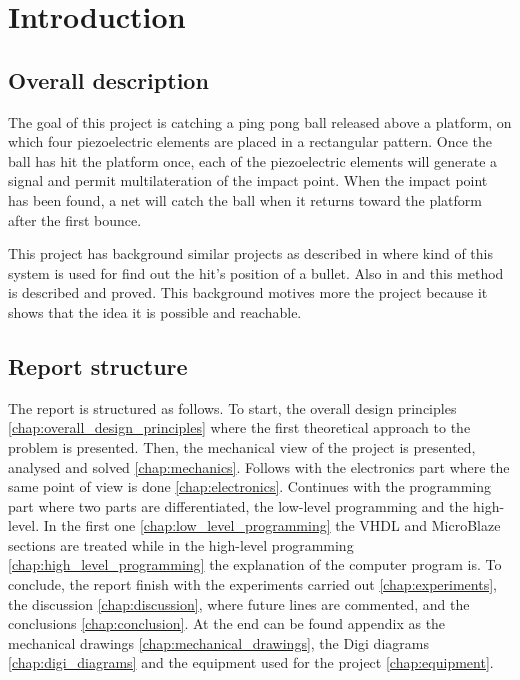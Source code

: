 \chapter{Introduction}
\label{chap:introduction}

	\section{Overall description}
		The goal of this project is catching a ping pong ball released above a platform, on which four piezoelectric elements are placed in a rectangular pattern.
		Once the ball has hit the platform once, each of the piezoelectric elements will generate a signal and permit multilateration of the impact point. When the impact point has been found, a net will catch the ball when it returns toward the platform after the first bounce.

		This project has background similar projects as described in \cite{electronic_target} where kind of this system is used for find out the hit's position of a bullet. Also in \cite{tdoa_book} and \cite{tdoa_notes} this method is described and proved. This background motives more the project because it shows that the idea it is possible and reachable.

	\section{Report structure}
	\label{sec:reportStructure}
		The report is structured as follows. To start, the overall design principles \ref{chap:overall_design_principles} where the first theoretical approach to the problem is presented.
		Then, the mechanical view of the project is presented, analysed and solved \ref{chap:mechanics}.
		Follows with the electronics part where the same point of view is done \ref{chap:electronics}.
		Continues with the programming part where two parts are differentiated, the low-level programming and the high-level.
		In the first one \ref{chap:low_level_programming} the VHDL and MicroBlaze sections are treated while in the high-level programming \ref{chap:high_level_programming} the explanation of the computer program is.
		To conclude, the report finish with the experiments carried out \ref{chap:experiments}, the discussion \ref{chap:discussion}, where future lines are commented, and the conclusions \ref{chap:conclusion}.
		At the end can be found appendix as the mechanical drawings \ref{chap:mechanical_drawings}, the Digi diagrams \ref{chap:digi_diagrams} and the equipment used for the project \ref{chap:equipment}.
